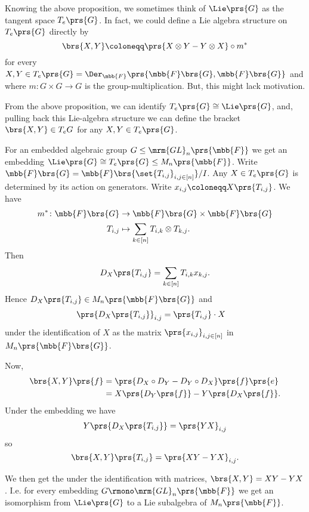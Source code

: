 \documentclass[10pt,a4paper,twoside,openany,hidelinks]{book}
\begin{document}
Knowing the above proposition, we sometimes think of $\Lie\prs{G}$ as the tangent space $T_e\prs{G}$.
In fact, we could define a Lie algebra structure on $T_e\prs{G}$ directly by
\begin{equation}\label{equation:direct_lie_bracket}
\brs{X,Y} \coloneqq \prs{X \otimes Y - Y \otimes X} \circ m^*
\end{equation}
for every $X,Y \in T_e\prs{G} = \Der_{\mbb{F}}\prs{\mbb{F}\brs{G}, \mbb{F}\brs{G}}$ and where $m \colon G \times G \to G$ is the group-multiplication. But, this might lack motivation.

From the above proposition, we can identify
$T_e\prs{G} \cong \Lie\prs{G}$, and, pulling back this Lie-algebra structure we can define the bracket
$\brs{X,Y} \in T_e G$ for any $X,Y \in T_e\prs{G}$.

For an embedded algebraic group $G \leq \mrm{GL}_n\prs{\mbb{F}}$ we get an embedding $\Lie\prs{G} \cong T_e\prs{G} \leq M_n\prs{\mbb{F}}$. Write $\mbb{F}\brs{G} = \mbb{F}\brs{\set{T_{i,j}}_{i,j \in [n]}}/I$. Any $X \in T_e\prs{G}$ is determined by its action on generators. Write $x_{i,j} \coloneqq X\prs{T_{i,j}}$. We have
\begin{align*}
m^* \colon \mbb{F}\brs{G} &\to \mbb{F}\brs{G} \times \mbb{F}\brs{G} \\
T_{i,j} &\mapsto \sum_{k \in [n]} T_{i,k} \otimes T_{k,j} \text{.}
\end{align*}
Then
\[D_X\prs{T_{i,j}} = \sum_{k \in [n]} T_{i,k} x_{k,j} \text{.}\]
Hence $D_X\prs{T_{i,j}} \in M_n\prs{\mbb{F}\brs{G}}$ and
\begin{align*}
\prs{D_X\prs{T_{i,j}}}_{i,j} &= \prs{T_{i,j}} \cdot X
\end{align*}
under the identification of $X$ as the matrix $\prs{x_{i,j}}_{i,j \in [n]}$ in $M_n\prs{\mbb{F}\brs{G}}$.

Now,
\begin{align*}
\brs{X,Y}\prs{f} &= \prs{D_X \circ D_Y - D_Y \circ D_X} \prs{f}\prs{e}
\\&= X\prs{D_Y\prs{f}} - Y\prs{D_X\prs{f}} \text{.}
\end{align*}
Under the embedding we have
\begin{align*}
Y\prs{D_X\prs{T_{i,j}}} = \prs{YX}_{i,j}
\end{align*}
so
\[\brs{X,Y}\prs{T_{i,j}} = \prs{XY - YX}_{i,j} \text{.}\]

We then get the under the identification with matrices, $\brs{X,Y} = XY - YX$. I.e. for every embedding $G \rmono \mrm{GL}_n\prs{\mbb{F}}$ we get an isomorphism from $\Lie\prs{G}$ to a Lie subalgebra of $M_n\prs{\mbb{F}}$.
\end{document}
